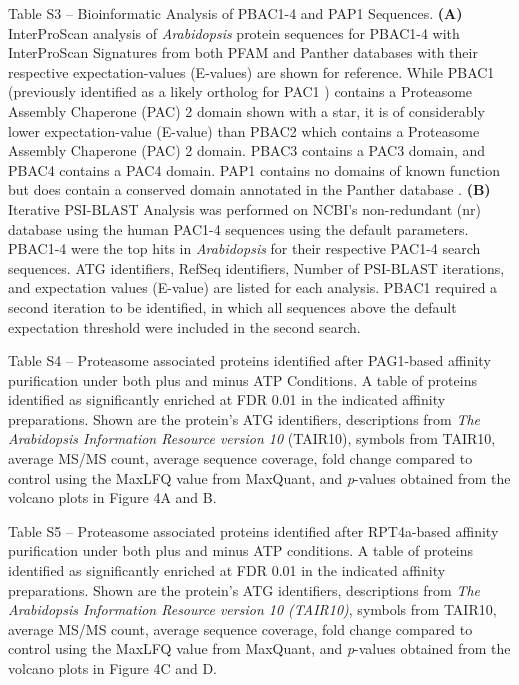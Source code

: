 Table S3 – Bioinformatic Analysis of PBAC1-4 and PAP1 Sequences. \textbf{(A)} InterProScan \citep{jones14} analysis of \textit{Arabidopsis} protein sequences for PBAC1-4 with InterProScan Signatures from both PFAM and Panther databases with their respective expectation-values (E-values) are shown for reference. While PBAC1 (previously identified as a likely ortholog for PAC1 \citep{kusmierczyk11}) contains a Proteasome Assembly Chaperone (PAC) 2 domain shown with a star, it is of considerably lower expectation-value (E-value) than PBAC2 which contains a Proteasome Assembly Chaperone (PAC) 2 domain. PBAC3 contains a PAC3 domain, and PBAC4 contains a PAC4 domain. PAP1 contains no domains of known function but does contain a conserved domain annotated in the Panther database \citep{mi05}. \textbf{(B)} Iterative PSI-BLAST Analysis was performed on NCBI’s non-redundant (nr) database using the human PAC1-4 sequences using the default parameters. PBAC1-4 were the top hits in \textit{Arabidopsis} for their respective PAC1-4 search sequences. ATG identifiers, RefSeq identifiers, Number of PSI-BLAST iterations, and expectation values (E-value) are listed for each analysis. PBAC1 required a second iteration to be identified, in which all sequences above the default expectation threshold were included in the second search.

Table S4 – Proteasome associated proteins identified after PAG1-based affinity purification under both plus and minus ATP Conditions. A table of proteins identified as significantly enriched at FDR 0.01 in the indicated affinity preparations.  Shown are the protein’s ATG identifiers, descriptions from \textit{The Arabidopsis Information Resource version 10} (TAIR10), symbols from TAIR10, average MS/MS count, average sequence coverage, fold change compared to control using the MaxLFQ value from MaxQuant, and \textit{p}-values obtained from the volcano plots in Figure 4A and B.

Table S5 – Proteasome associated proteins identified after RPT4a-based affinity purification under both plus and minus ATP conditions. A table of proteins identified as significantly enriched at FDR 0.01 in the indicated affinity preparations.  Shown are the protein’s ATG identifiers, descriptions from \textit{The Arabidopsis Information Resource version 10 (TAIR10)}, symbols from TAIR10, average MS/MS count, average sequence coverage, fold change compared to control using the MaxLFQ value from MaxQuant, and \textit{p}-values obtained from the volcano plots in Figure 4C and D.

